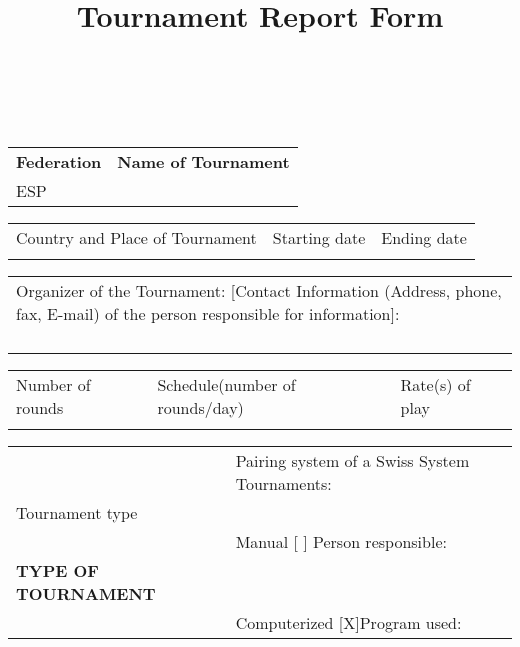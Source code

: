 \documentclass[11pt, a4paper]{article}
\title{Tournament Report Form}
\date{}
\author{}
\begin{document}
\thispagestyle{empty}

\begin{table}[ht]
\\
\\
\small
\noindent\begin{tabular}{|p{5cm}|p{10.97cm}|}
\hline
{\bfseries Federation}&{\bfseries Name of Tournament}\\
\normalsize ESP& \\
\hline
\end{tabular}

\noindent\begin{tabular}{|p{11cm}|p{2.28cm}|p{2.27cm}|}
Country and Place of Tournament&Starting date&Ending date\\
& & \\
\hline
\end{tabular}

\noindent\begin{tabular}{|p{16.4cm}|}
Organizer of the Tournament: [Contact Information (Address, phone, fax, E-mail) of the person responsible for information]:\\
{\normalsize}\\
{\normalsize}\\
{\normalsize}\\
\\
\hline
\end{tabular}

\noindent\begin{tabular}{|p{5cm}|p{5.4cm}|p{5.15cm}|}
Number of rounds&Schedule(number of rounds/day)&Rate(s) of play\\
& &\\
\hline
\end{tabular}

\noindent\begin{tabular}{|p{4cm}|p{11.97cm}|}
&Pairing system of a Swiss System Tournaments:\\
Tournament type&\\
&Manual\hspace{1cm} [ ]\hspace{1cm} Person responsible:\\
{\bfseries \normalsize TYPE OF TOURNAMENT}& \\
&Computerized [X]\hspace{1cm}Program used:\\
\hline
\end{tabular}


\end{table}
\end{document}
